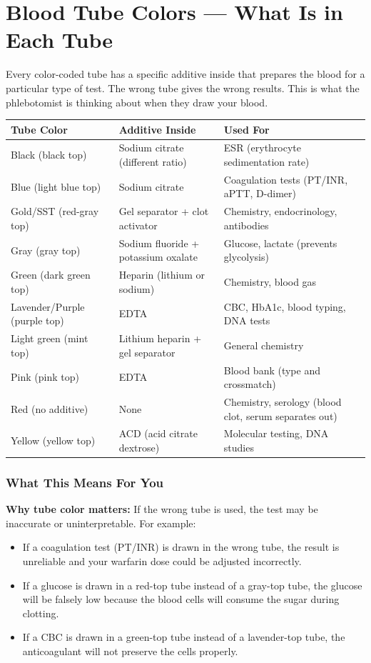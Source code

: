 \clearpage
\section{Blood Tube Colors --- What Is in Each Tube}

Every color-coded tube has a specific additive inside that prepares the blood for a particular type of test. The wrong tube gives the wrong results. This is what the phlebotomist is thinking about when they draw your blood.

\begin{longtable}{@{}lll@{}}
\toprule
\textbf{Tube Color} & \textbf{Additive Inside} & \textbf{Used For} \\
\midrule
Black (black top) & Sodium citrate (different ratio) & ESR (erythrocyte sedimentation rate) \\
Blue (light blue top) & Sodium citrate & Coagulation tests (PT/INR, aPTT, D-dimer) \\
Gold/SST (red-gray top) & Gel separator + clot activator & Chemistry, endocrinology, antibodies \\
Gray (gray top) & Sodium fluoride + potassium oxalate & Glucose, lactate (prevents glycolysis) \\
Green (dark green top) & Heparin (lithium or sodium) & Chemistry, blood gas \\
Lavender/Purple (purple top) & EDTA & CBC, HbA1c, blood typing, DNA tests \\
Light green (mint top) & Lithium heparin + gel separator & General chemistry \\
Pink (pink top) & EDTA & Blood bank (type and crossmatch) \\
Red (no additive) & None & Chemistry, serology (blood clot, serum separates out) \\
Yellow (yellow top) & ACD (acid citrate dextrose) & Molecular testing, DNA studies \\
\bottomrule
\end{longtable}

\subsubsection{What This Means For You}

\textbf{Why tube color matters:} If the wrong tube is used, the test may be inaccurate or uninterpretable. For example:
\begin{itemize}
    \item If a coagulation test (PT/INR) is drawn in the wrong tube, the result is unreliable and your warfarin dose could be adjusted incorrectly.
    \item If a glucose is drawn in a red-top tube instead of a gray-top tube, the glucose will be falsely low because the blood cells will consume the sugar during clotting.
    \item If a CBC is drawn in a green-top tube instead of a lavender-top tube, the anticoagulant will not preserve the cells properly.
\end{itemize}

